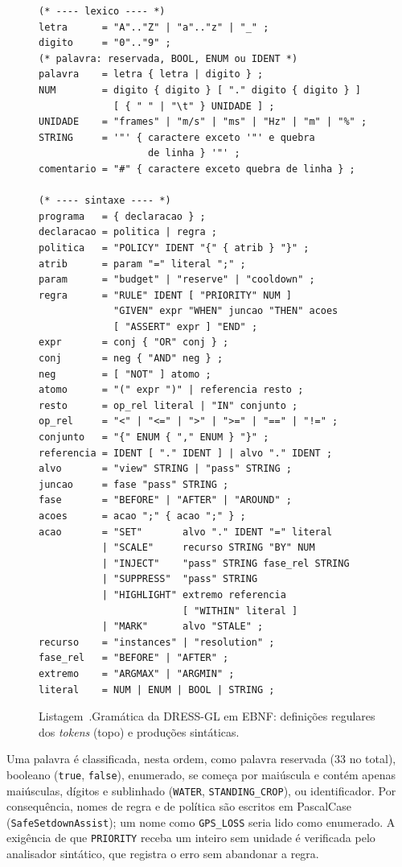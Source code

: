 \documentclass[conference]{IEEEtran}
\renewcommand{\lstlistingname}{Listagem}
\newenvironment{blocolstflut}[1][tbp]%
  {\begin{figure}[#1]\noindent\begin{minipage}{\columnwidth}}%
  {\end{minipage}\end{figure}}
\newcommand{\legendalst}[2]{%
  \par\vspace{2pt}%
  \refstepcounter{lstlisting}\label{#1}%
  {\footnotesize\lstlistingname~\thelstlisting.\enspace #2\par}}
\begin{document}
\begin{blocolstflut}
\begin{lstlisting}[basicstyle=\ttfamily\fontsize{6.5}{7.8}\selectfont]
(* ---- lexico ---- *)
letra      = "A".."Z" | "a".."z" | "_" ;
digito     = "0".."9" ;
(* palavra: reservada, BOOL, ENUM ou IDENT *)
palavra    = letra { letra | digito } ;
NUM        = digito { digito } [ "." digito { digito } ]
             [ { " " | "\t" } UNIDADE ] ;
UNIDADE    = "frames" | "m/s" | "ms" | "Hz" | "m" | "%" ;
STRING     = '"' { caractere exceto '"' e quebra
                   de linha } '"' ;
comentario = "#" { caractere exceto quebra de linha } ;

(* ---- sintaxe ---- *)
programa   = { declaracao } ;
declaracao = politica | regra ;
politica   = "POLICY" IDENT "{" { atrib } "}" ;
atrib      = param "=" literal ";" ;
param      = "budget" | "reserve" | "cooldown" ;
regra      = "RULE" IDENT [ "PRIORITY" NUM ]
             "GIVEN" expr "WHEN" juncao "THEN" acoes
             [ "ASSERT" expr ] "END" ;
expr       = conj { "OR" conj } ;
conj       = neg { "AND" neg } ;
neg        = [ "NOT" ] atomo ;
atomo      = "(" expr ")" | referencia resto ;
resto      = op_rel literal | "IN" conjunto ;
op_rel     = "<" | "<=" | ">" | ">=" | "==" | "!=" ;
conjunto   = "{" ENUM { "," ENUM } "}" ;
referencia = IDENT [ "." IDENT ] | alvo "." IDENT ;
alvo       = "view" STRING | "pass" STRING ;
juncao     = fase "pass" STRING ;
fase       = "BEFORE" | "AFTER" | "AROUND" ;
acoes      = acao ";" { acao ";" } ;
acao       = "SET"       alvo "." IDENT "=" literal
           | "SCALE"     recurso STRING "BY" NUM
           | "INJECT"    "pass" STRING fase_rel STRING
           | "SUPPRESS"  "pass" STRING
           | "HIGHLIGHT" extremo referencia
                         [ "WITHIN" literal ]
           | "MARK"      alvo "STALE" ;
recurso    = "instances" | "resolution" ;
fase_rel   = "BEFORE" | "AFTER" ;
extremo    = "ARGMAX" | "ARGMIN" ;
literal    = NUM | ENUM | BOOL | STRING ;
\end{lstlisting}
\legendalst{lst:ebnf}{Gramática da DRESS-GL em EBNF: definições regulares dos
\textit{tokens} (topo) e produções sintáticas.}
\end{blocolstflut}

Uma palavra é classificada, nesta ordem, como palavra reservada (33 no total),
booleano (\texttt{true}, \texttt{false}), enumerado, se começa por maiúscula e
contém apenas maiúsculas, dígitos e sublinhado (\texttt{WATER},
\texttt{STANDING\_CROP}), ou identificador. Por consequência, nomes de regra e
de política são escritos em PascalCase (\texttt{SafeSetdownAssist}); um nome
como \texttt{GPS\_LOSS} seria lido como enumerado. A exigência de que
\texttt{PRIORITY} receba um inteiro sem unidade é verificada pelo analisador
sintático, que registra o erro sem abandonar a regra.
\end{document}
